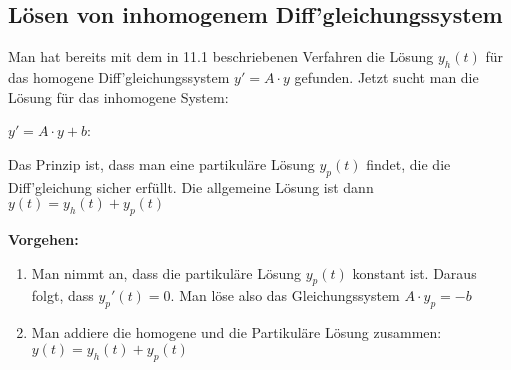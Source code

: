 \subsection{Lösen von inhomogenem Diff'gleichungssystem}{
\vskip1pt

Man hat bereits mit dem in 11.1 beschriebenen Verfahren die Lösung $y_h(t)$ für das homogene Diff'gleichungssystem $y' = A\cdot y$ gefunden. Jetzt sucht man die Lösung für das inhomogene System: \vskip5pt
\begin{center}
$y' = A\cdot y + b$: \vskip5pt
\end{center}
\vskip5pt
Das Prinzip ist, dass man eine partikuläre Lösung $y_p(t)$ findet, die die Diff'gleichung sicher erfüllt. Die allgemeine Lösung ist dann $y(t) = y_h(t) + y_p(t)$ \par
\vskip6pt

\textbf{Vorgehen:} \vskip1pt

\begin{enumerate}
\item Man nimmt an, dass die partikuläre Lösung $y_p(t)$ konstant ist. Daraus folgt, dass $y_p'(t) = 0$. Man löse also das Gleichungssystem $A \cdot y_p = -b$\\
\item Man addiere die homogene und die Partikuläre Lösung zusammen: $y(t) = y_h(t) + y_p(t)$\\
\end{enumerate}

}
